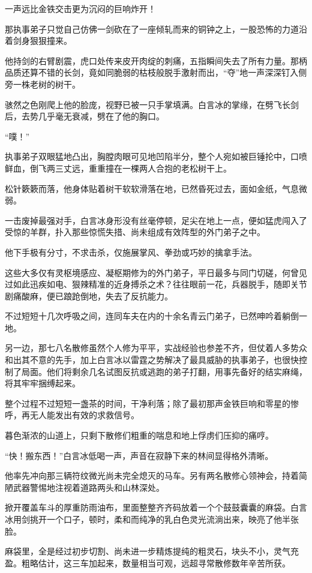 一声远比金铁交击更为沉闷的巨响炸开！

那执事弟子只觉自己仿佛一剑砍在了一座倾轧而来的铜钟之上，一股恐怖的力道沿着剑身狠狠撞来。

他持剑的右臂剧震，虎口处传来皮开肉绽的刺痛，五指瞬间失去了所有力量。那柄品质还算不错的长剑，竟如同脆弱的枯枝般脱手激射而出，“夺”地一声深深钉入侧旁一株老树的树干。

骇然之色刚爬上他的脸庞，视野已被一只手掌填满。白言冰的掌缘，在劈飞长剑后，去势几乎毫无衰减，劈在了他的胸口。

“噗！”

执事弟子双眼猛地凸出，胸膛肉眼可见地凹陷半分，整个人宛如被巨锤抡中，口喷鲜血，倒飞两三丈远，重重撞在一棵两人合抱的老松树干上。

松针簌簌而落，他身体贴着树干软软滑落在地，已然昏死过去，面如金纸，气息微弱。

一击废掉最强对手，白言冰身形没有丝毫停顿，足尖在地上一点，便如猛虎闯入了受惊的羊群，扑入那些惊慌失措、尚未组成有效阵型的外门弟子之中。

他下手极有分寸，不求击杀，仅施展掌风、拳劲或巧妙的擒拿手法。

这些大多仅有灵枢境感应、凝枢期修为的外门弟子，平日最多与同门切磋，何曾见过如此迅疾如电、狠辣精准的近身搏杀之术？往往眼前一花，兵器脱手，随即关节剧痛酸麻，便已踉跄倒地，失去了反抗能力。

不过短短十几次呼吸之间，连同车夫在内的十余名青云门弟子，已然呻吟着躺倒一地。

另一边，那七八名散修虽然个人修为平平，实战经验也参差不齐，但仗着人多势众和出其不意的先手，加上白言冰以雷霆之势解决了最具威胁的执事弟子，也很快控制了局面。他们将剩余几名试图反抗或逃跑的弟子打翻，用事先备好的结实麻绳，将其牢牢捆缚起来。

整个过程不过短短一盏茶的时间，干净利落；除了最初那声金铁巨响和零星的惨呼，再无人能发出有效的求救信号。

暮色渐浓的山道上，只剩下散修们粗重的喘息和地上俘虏们压抑的痛哼。

“快！搬东西！”白言冰低喝一声，声音在寂静下来的林间显得格外清晰。

他率先冲向那三辆符纹微光尚未完全熄灭的马车。另有两名散修心领神会，持着简陋武器警惕地注视着道路两头和山林深处。

掀开覆盖车斗的厚重防雨油布，里面整整齐齐码放着一个个鼓鼓囊囊的麻袋。白言冰用剑挑开一个口子，顿时，柔和而纯净的乳白色灵光流淌出来，映亮了他半张脸。

麻袋里，全是经过初步切割、尚未进一步精炼提纯的粗灵石，块头不小，灵气充盈。粗略估计，这三车加起来，数量相当可观，远超寻常散修数年辛苦所获。


